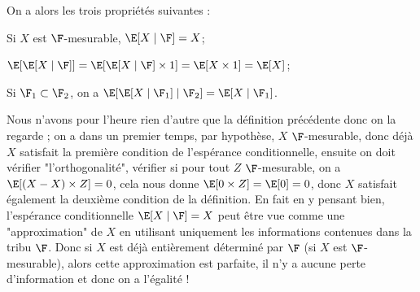 \bp
On a alors les trois propriétés suivantes :
\ben
    \item Si $X$ est $\F$-mesurable, $\E[X\mid \F] = X$;
    \item $\E[\E[X\mid \F]] = \E[\E[X\mid \F]\times 1] = \E[X \times 1] = \E[X]$;
    \item Si $\F_1 \subset \F_2$, on a $\E[\E[X\mid \F_1]\mid \F_2] = \E[X\mid \F_1]$.
\een
\ep
\bpf[esquisse]
\ben
    \item Nous n'avons pour l'heure rien d'autre que la définition précédente donc on la regarde  ; on a dans un premier temps, par hypothèse, $X$ $\F$-mesurable, donc déjà $X$ satisfait la première condition de l'espérance conditionnelle, ensuite on doit vérifier "l'orthogonalité", \ie vérifier si pour tout $Z$ $\F$-mesurable, on a $\E[(X-X)\times Z] = 0$, cela nous donne $\E[0\times Z] =\E[0] = 0$, donc $X$ satisfait également la deuxième condition de la définition.
    \bn
    En fait en y pensant bien, l'espérance conditionnelle $\E[X\mid \F] = X$ peut être vue comme une "approximation" de $X$ en utilisant uniquement les informations contenues dans la tribu $\F$. Donc si $X$ est déjà entièrement déterminé par $\F$ (\ie si $X$ est $\F$-mesurable), alors cette approximation est parfaite, il n'y a aucune perte d'information et donc on a l'égalité ! 
    \en
\een
\epf
    
    
    
    
    
    
    
    
    
    
    

